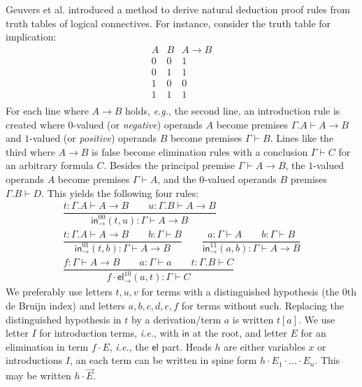 \documentclass[a4paper,USenglish,cleveref, autoref, thm-restate]{lipics-v2019}
\newcommand{\ie}{\emph{i.e.}\xspace}
\newcommand{\eg}{\emph{e.g.}\xspace}
\newcommand{\ru}{\dfrac}
\newcommand{\tin}{\ensuremath{\mathsf{in}}}
\newcommand{\inn}[2]{\tin_{#1}^{#2}}
\newcommand{\tel}{\mathsf{el}}
\newcommand{\el}[2]{\tel_{#1}^{#2}}
\begin{document}
Geuvers et al. \cite{todo} introduced a method to derive natural
deduction proof rules from truth tables of logical connectives.
For instance, consider the truth table for implication:
\[
\begin{array}{cc|c}
  A & B & A \to B \\
\hline
  0 & 0 & 1 \\
  0 & 1 & 1 \\
  1 & 0 & 0 \\
  1 & 1 & 1 \\
\end{array}
\]
For each line where $A \to B$ holds, \eg, the second line,
an introduction rule is created
where $0$-valued (or \emph{negative})
operands $A$ become premises $\Gamma.A \vdash A \to B$
and $1$-valued (or \emph{positive}) operands $B$ become premises $\Gamma \vdash B$.
Lines like the third where $A \to B$ is false become elimination
rules with a conclusion $\Gamma \vdash C$ for an arbitrary formula
$C$.  Besides the principal premise $\Gamma \vdash A \to B$, the
$1$-valued operands $A$ become premises $\Gamma \vdash A$, and the
$0$-valued operands $B$ premises $\Gamma.B \vdash D$.
This yields the following four rules:
\begin{gather*}
  \ru{t : \Gamma.A \vdash A \to B \qquad
      u : \Gamma.B \vdash A \to B
    }{\inn\to{00}(t,u) : \Gamma \vdash A \to B
    }
\\[2ex]
  \ru{t : \Gamma.A \vdash A \to B \qquad
      b : \Gamma \vdash B
    }{\inn\to{01}(t,b) : \Gamma \vdash A \to B
    }
\qquad
  \ru{a : \Gamma \vdash A \qquad
      b : \Gamma \vdash B
    }{\inn\to{11}(a,b) : \Gamma \vdash A \to B
    }
\\[2ex]
  \ru{f : \Gamma \vdash A \to B \qquad
      a : \Gamma \vdash a \qquad
      t : \Gamma.B \vdash C
    }{f \cdot \el\to{10}(a,t) : \Gamma \vdash C
    }
\end{gather*}
We preferably use letters $t,u,v$ for terms with a distinguished
hypothesis (the 0th de Bruijn index)
and letters $a,b,c,d,e,f$ for terms without such.
Replacing the distinguished hypothesis in $t$ by a derivation/term $a$
is written $t[a]$.  We use letter $I$ for introduction terms, \ie,
with $\tin$ at the root, and letter $E$ for an elimination in term $f
\cdot E$, \ie, the $\tel$ part.  Heads $h$ are either variables $x$ or
introductions $I$, an each term can be written in spine form $h \cdot
E_1 \cdot \dots \cdot E_n$.  This may be written $h \cdot \vec E$.
\end{document}
